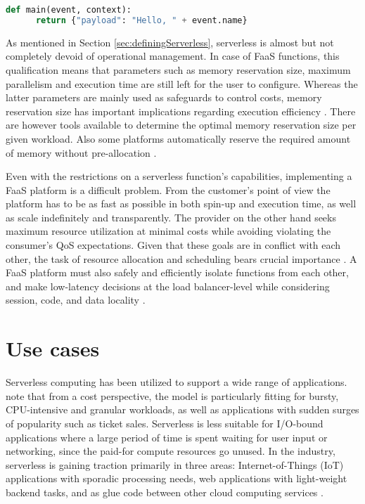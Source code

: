 \begin{lstlisting}[language=Python,caption=Example FaaS handler in Python,label=lst:handlerExample]
  def main(event, context):
      return {"payload": "Hello, " + event.name}
\end{lstlisting}

As mentioned in Section \ref{sec:definingServerless}, serverless is almost but not completely devoid of operational management. In case of FaaS functions, this qualification means that parameters such as memory reservation size, maximum parallelism and execution time are still left for the user to configure. Whereas the latter parameters are mainly used as safeguards to control costs, memory reservation size has important implications regarding execution efficiency \parencite{lloydserverless}. There are however tools available to determine the optimal memory reservation size per given workload. Also some platforms automatically reserve the required amount of memory without pre-allocation \parencite{microsoft18azureFunctions}.

Even with the restrictions on a serverless function's capabilities, implementing a FaaS platform is a difficult problem. From the customer's point of view the platform has to be as fast as possible in both spin-up and execution time, as well as scale indefinitely and transparently. The provider on the other hand seeks maximum resource utilization at minimal costs while avoiding violating the consumer's QoS expectations. Given that these goals are in conflict with each other, the task of resource allocation and scheduling bears crucial importance \parencite{reza17controller}. A FaaS platform must also safely and efficiently isolate functions from each other, and make low-latency decisions at the load balancer-level while considering session, code, and data locality \parencite{hendrickson16openlambda}.

\section{Use cases} \label{sec:useCases}

Serverless computing has been utilized to support a wide range of applications. \textcite{baldini17currentTrends} note that from a cost perspective, the model is particularly fitting for bursty, CPU-intensive and granular workloads, as well as applications with sudden surges of popularity such as ticket sales. Serverless is less suitable for I/O-bound applications where a large period of time is spent waiting for user input or networking, since the paid-for compute resources go unused. In the industry, serverless is gaining traction primarily in three areas: Internet-of-Things (IoT) applications with sporadic processing needs, web applications with light-weight backend tasks, and as glue code between other cloud computing services \parencite{spillner18faaster}.


